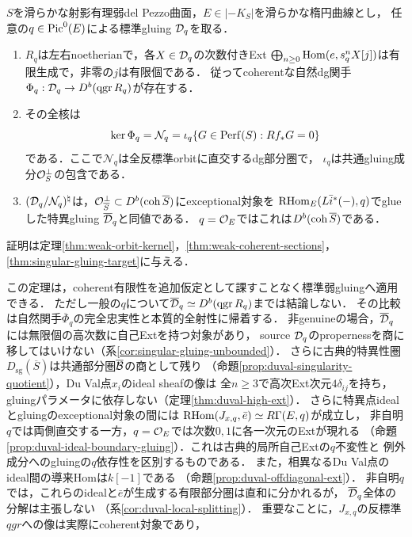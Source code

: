 \begin{theorem}[弱gluingのcoherent収縮と商圏の記述]\label{thm:weak-summary}
$S$を滑らかな射影有理弱del Pezzo曲面，$E\in|-K_S|$を滑らかな楕円曲線とし，
任意の$q\in\operatorname{Pic}^0(E)$による標準gluing $\mathcal D_q$を取る．
\begin{enumerate}
\item $R_q$は左右noetherianで，各$X\in\mathcal D_q$の次数付きExt
$\bigoplus_{n\ge0}\operatorname{Hom}(e,s_q^nX[j])$は有限生成で，非零の$j$は有限個である．
従ってcoherentな自然dg関手$\Phi_q:\mathcal D_q\to D^b(\operatorname{qgr} R_q)$が存在する．
\item その全核は
\[
 \ker\Phi_q=\mathcal N_q
 =\iota_q\{G\in\operatorname{Perf}(S):Rf_*G=0\}
\]
である．ここで$\mathcal N_q$は全反標準orbitに直交するdg部分圏で，
$\iota_q$は共通gluing成分$\mathcal O_S^\perp$の包含である．
\item $(\mathcal D_q/\mathcal N_q)^\natural$は，$\mathcal O_{
\overline S}^{\perp}\subset D^b(\operatorname{coh}\overline S)$にexceptional対象を
$\operatorname{RHom}_E(L\bar i^*(-),q)$でglueした特異gluing $\overline{\mathcal D}_q$と同値である．
$q=\mathcal O_E$ではこれは$D^b(\operatorname{coh}\overline S)$である．
\end{enumerate}
証明は定理\ref{thm:weak-orbit-kernel}，\ref{thm:weak-coherent-sections}，
\ref{thm:singular-gluing-target}に与える．
\end{theorem}
この定理は，coherent有限性を追加仮定として課すことなく標準弱gluingへ適用できる．
ただし一般の$q$について$\overline{\mathcal D}_q\simeq D^b(\operatorname{qgr} R_q)$までは結論しない．
その比較は自然関手$\overline\Phi_q$の完全忠実性と本質的全射性に帰着する．
非genuineの場合，$\overline{\mathcal D}_q$には無限個の高次数に自己Extを持つ対象があり，
source $\mathcal D_q$のpropernessを商に移してはいけない（系\ref{cor:singular-gluing-unbounded}）．
さらに古典的特異性圏$D_{\mathrm{sg}}(\overline S)$は共通部分圏$\overline{\mathcal B}$の商として残り
（命題\ref{prop:duval-singularity-quotient}），Du Val点$x_i$のideal sheafの像は
全$n\ge3$で高次Ext次元$4\delta_{ij}$を持ち，
gluingパラメータに依存しない（定理\ref{thm:duval-high-ext}）．
さらに特異点idealとgluingのexceptional対象の間には
$\operatorname{RHom}(J_{x,q},\bar e)\simeq R\Gamma(E,q)$が成立し，
非自明$q$では両側直交する一方，$q=\mathcal O_E$では次数$0,1$に各一次元のExtが現れる
（命題\ref{prop:duval-ideal-boundary-gluing}）．これは古典的局所自己Extの$q$不変性と
例外成分へのgluingの$q$依存性を区別するものである．
また，相異なるDu Val点のideal間の導来Homは$k[-1]$である
（命題\ref{prop:duval-offdiagonal-ext}）．
非自明$q$では，これらのidealと$\bar e$が生成する有限部分圏は直和に分かれるが，
$\overline{\mathcal D}_q$全体の分解は主張しない
（系\ref{cor:duval-local-splitting}）．
重要なことに，$J_{x,q}$の反標準$qgr$への像は実際にcoherent対象であり，
